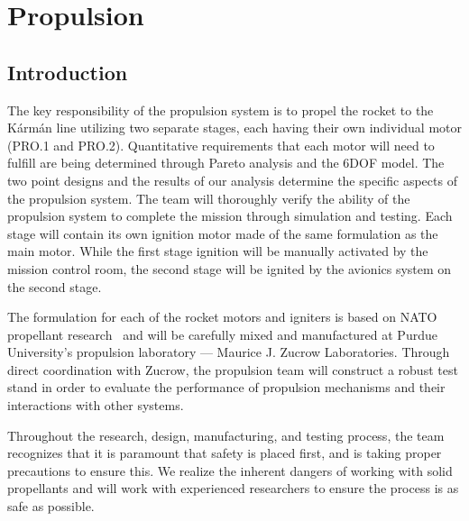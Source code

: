 \section{Propulsion} \label{section:propulsion}
\subsection{Introduction} %

The key responsibility of the propulsion system is to propel the rocket to the K\'{a}rm\'{a}n line utilizing two separate stages, each having their own individual motor (PRO.1 and PRO.2). Quantitative requirements that each motor will need to fulfill are being determined through Pareto analysis and the 6DOF model. The two point designs and the results of our analysis determine the specific aspects of the propulsion system. The team will thoroughly verify the ability of the propulsion system to complete the mission through simulation and testing. Each stage will contain its own ignition motor made of the same formulation as the main motor. While the first stage ignition will be manually activated by the mission control room, the second stage will be ignited by the avionics system on the second stage.

The formulation for each of the rocket motors and igniters is based on NATO propellant research~\cite{butacene} and will be carefully mixed and manufactured at Purdue University's propulsion laboratory --- Maurice J. Zucrow Laboratories. Through direct coordination with Zucrow, the propulsion team will construct a robust test stand in order to evaluate the performance of propulsion mechanisms and their interactions with other systems.

Throughout the research, design, manufacturing, and testing process, the team recognizes that it is paramount that safety is placed first, and is taking proper precautions to ensure this. We realize the inherent dangers of working with solid propellants and will work with experienced researchers to ensure the process is as safe as possible.


